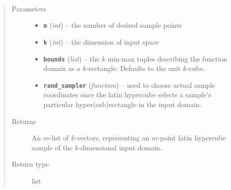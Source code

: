 \documentclass[letterpaper,10pt,english]{sphinxmanual}
\begin{document}
\begin{fulllineitems}
\label{index:smbo.samplers.latin_hypercube}~\begin{quote}\begin{description}
\item[{Parameters}] \leavevmode\begin{itemize}
\item {} 
\textbf{\texttt{m}} (\emph{int}) -- the number of desired sample points

\item {} 
\textbf{\texttt{k}} (\emph{int}) -- the dimension of input space

\item {} 
\textbf{\texttt{bounds}} (\emph{list}) -- the \(k\) min-max tuples describing the function domain as a \(k\)-rectangle. Defaults to the unit \(k\)-cube.

\item {} 
\textbf{\texttt{rand\_sampler}} (\emph{function}) -- used to choose actual sample coordinates once the latin hypercube selects a sample's particular hyper(sub)rectangle in the input domain.

\end{itemize}

\item[{Returns}] \leavevmode
An \(m\)-list of \(k\)-vectors, representing an \(m\)-point latin hypercube sample of the \(k\)-dimensional input domain.

\item[{Return type}] \leavevmode
list

\end{description}\end{quote}

\end{fulllineitems}

\label{index:module-smbo.lazyprop}\label{index:module-lazyprop}
\end{document}
